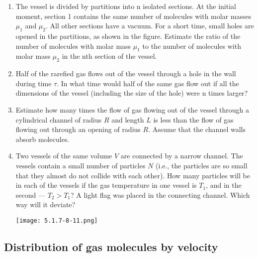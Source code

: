 \documentclass{article}
\begin{document}
\begin{enumerate}[label=5.1.\arabic*]
\item The vessel is divided by partitions into n isolated sections. At the initial moment, section 1 contains the same number of molecules with molar masses $\mu_1$ and $\mu_2$. All other sections have a vacuum. For a short time, small holes are opened in the partitions, as shown in the figure. Estimate the ratio of the number of molecules with molar mass $\mu_1$ to the number of molecules with molar mass $\mu_2$ in the nth section of the vessel.

\item Half of the rarefied gas flows out of the vessel through a hole in the wall during time $\tau$. In what time would half of the same gas flow out if all the dimensions of the vessel (including the size of the hole) were n times larger?

\item Estimate how many times the flow of gas flowing out of the vessel through a cylindrical channel of radius $R$ and length $L$ is less than the flow of gas flowing out through an opening of radius $R$. Assume that the channel walls absorb molecules.

\item Two vessels of the same volume $V$ are connected by a narrow channel. The vessels contain a small number of particles $N$ (i.e., the particles are so small that they almost do not collide with each other). How many particles will be in each of the vessels if the gas temperature in one vessel is $T_1$, and in the second — $T_2 > T_1$? A light flag was placed in the connecting channel. Which way will it deviate?

\begin{center}
    \texttt{[image: 5.1.7-8-11.png]}
\end{center}




\end{enumerate}

\subsection{Distribution of gas molecules by velocity}
\end{document}
